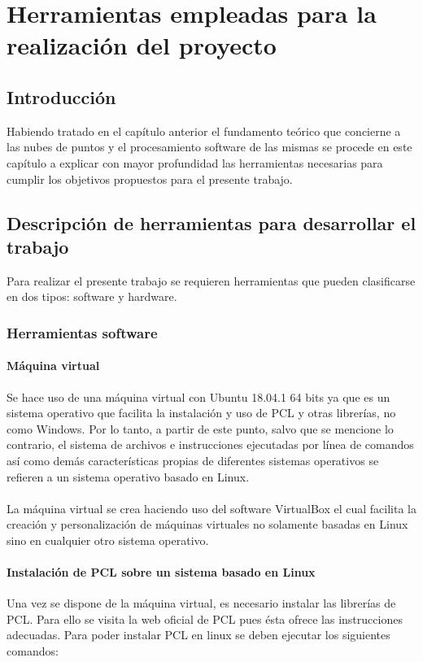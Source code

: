 \chapter{Herramientas empleadas para la realización del proyecto}

\section{Introducción}
Habiendo tratado en el capítulo anterior el fundamento teórico que concierne a las nubes de puntos y el procesamiento software de las mismas se procede en este capítulo a explicar con mayor profundidad las herramientas necesarias para cumplir los objetivos propuestos para el presente trabajo.



\section{Descripción de herramientas para desarrollar el trabajo}
Para realizar el presente trabajo se requieren herramientas que pueden clasificarse en dos tipos: software y hardware.

\subsection{Herramientas software}
\subsubsection{Máquina virtual}
Se hace uso de una máquina virtual con Ubuntu\cite{ubuntu} 18.04.1 64 bits ya que es un sistema operativo que facilita la instalación y uso de PCL y otras librerías, no como Windows.
Por lo tanto, a partir de este punto, salvo que se mencione lo contrario, el sistema de archivos e instrucciones ejecutadas por línea de comandos así como demás características propias de diferentes sistemas operativos se refieren a un sistema operativo basado en Linux.
\\
\\
La máquina virtual se crea haciendo uso del software VirtualBox\cite{virtualbox} el cual facilita la creación y personalización de máquinas virtuales no solamente basadas en Linux sino en cualquier otro sistema operativo.

\subsubsection{Instalación de PCL sobre un sistema basado en Linux}
Una vez se dispone de la máquina virtual, es necesario instalar las librerías de PCL\cite{pcl_installation}. Para ello se visita la web oficial de PCL pues ésta ofrece las instrucciones adecuadas. Para poder instalar PCL en linux se deben ejecutar los siguientes comandos:

